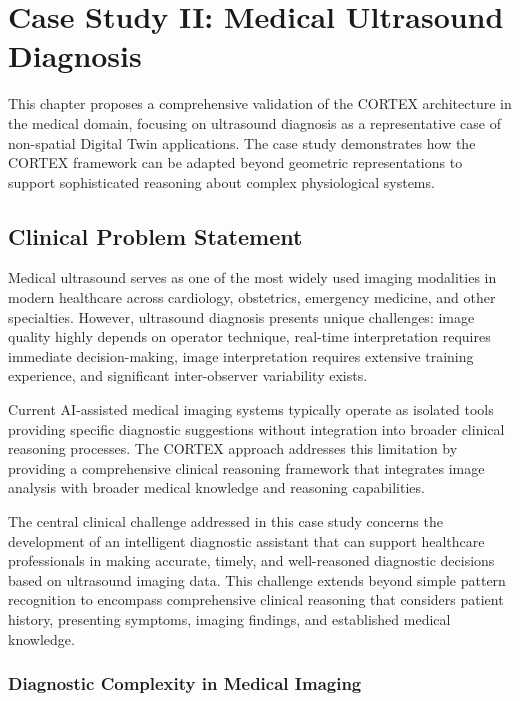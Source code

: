 
\chapter{Case Study II: Medical Ultrasound Diagnosis} \label{chp:medical}

This chapter proposes a comprehensive validation of the CORTEX architecture in the medical domain, focusing on ultrasound diagnosis as a representative case of non-spatial Digital Twin applications. The case study demonstrates how the CORTEX framework can be adapted beyond geometric representations to support sophisticated reasoning about complex physiological systems.

\section{Clinical Problem Statement}

Medical ultrasound serves as one of the most widely used imaging modalities in modern healthcare across cardiology, obstetrics, emergency medicine, and other specialties. However, ultrasound diagnosis presents unique challenges: image quality highly depends on operator technique, real-time interpretation requires immediate decision-making, image interpretation requires extensive training experience, and significant inter-observer variability exists.

Current AI-assisted medical imaging systems typically operate as isolated tools providing specific diagnostic suggestions without integration into broader clinical reasoning processes. The CORTEX approach addresses this limitation by providing a comprehensive clinical reasoning framework that integrates image analysis with broader medical knowledge and reasoning capabilities.

The central clinical challenge addressed in this case study concerns the development of an intelligent diagnostic assistant that can support healthcare professionals in making accurate, timely, and well-reasoned diagnostic decisions based on ultrasound imaging data. This challenge extends beyond simple pattern recognition to encompass comprehensive clinical reasoning that considers patient history, presenting symptoms, imaging findings, and established medical knowledge.

\subsection{Diagnostic Complexity in Medical Imaging}

